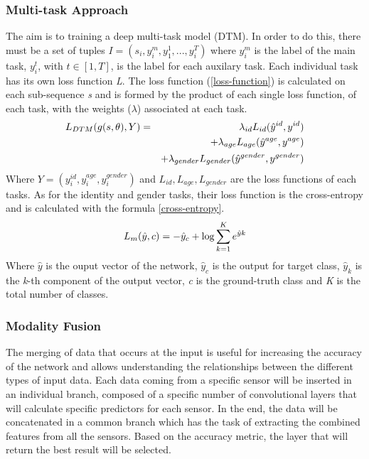 \subsubsection{Multi-task Approach}
The aim is to training a deep multi-task model (DTM). In order to do this, 
there must be a set of tuples $ I = (s_i, y_i^m, y_1^1, ..., y_i^T) $ where $ y_i^m $ is the label 
of the main task, $ y_i^t $, with $ t \in [1,T] $, is the label for each auxilary task. 
Each individual task has its own loss function \emph{L}. The loss function (\ref{loss-function}) is 
calculated on each sub-sequence \emph{s} and is formed by the product of each single 
loss function, of each task, with the weights ($ \lambda $)  associated at each task.
\begin{eqnarray}\label{loss-function}
    \emph{$ L_{DTM} (g(s,\theta), Y) $} & = & \lambda_{id}L_{id}(\hat{y}^{id}, y^{id}) \nonumber \\
                                        &   & + \lambda_{age}L_{age}(\hat{y}^{age}, y^{age}) \nonumber \\
                                        &   & + \lambda_{gender}L_{gender}(\hat{y}^{gender}, y^{gender}) 
\end{eqnarray}
Where $ Y = (y^{id}_i, y^{age}_i, y^{gender}_i) $ and $ L_{id}, L_{age}, L_{gender} $ are the loss functions of 
each tasks. As for the identity and gender tasks, their loss function is the 
cross-entropy and is calculated with the formula \ref{cross-entropy}.
\begin{equation}\label{cross-entropy}
    \emph{$ L_m(\hat{y}, c) $} = -\hat{y}_c+\log\sum^K_{k=1}e^{\hat{y}k} 
\end{equation}
Where $ \hat{y} $ is the ouput vector of the network, $ \hat{y}_c $ is the output for target class, 
$ \hat{y}_k $ is the \emph{k}-th component of the output vector, \emph{c} is the ground-truth class 
and \emph{K} is the total number of classes.

\subsubsection{Modality Fusion}
The merging of data that occurs at the input is useful for increasing the accuracy of the 
network and allows understanding the relationships between 
the different types of input data. Each data coming from a specific sensor 
will be inserted in an individual branch, composed of a specific number of 
convolutional layers that will calculate specific predictors for each sensor. 
In the end, the data will be concatenated in a common branch which has the 
task of extracting the combined features from all the sensors. Based on the accuracy metric, the 
layer that will return the best result will be selected.

